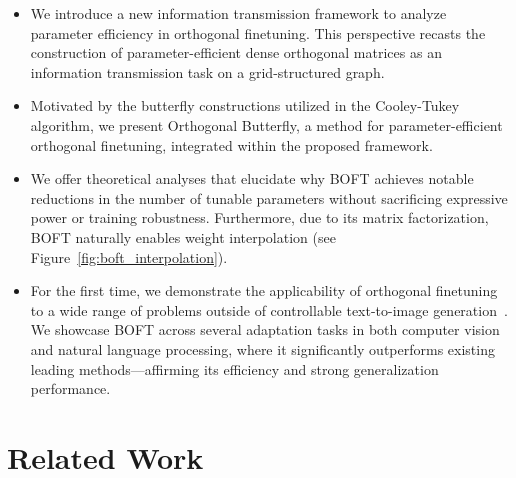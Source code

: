 \begin{itemize}[leftmargin=*,nosep]
    \item We introduce a new information transmission framework to analyze parameter efficiency in orthogonal finetuning. This perspective recasts the construction of parameter-efficient dense orthogonal matrices as an information transmission task on a grid-structured graph.
    \item Motivated by the butterfly constructions utilized in the Cooley-Tukey algorithm, we present Orthogonal Butterfly, a method for parameter-efficient orthogonal finetuning, integrated within the proposed framework.
    \item We offer theoretical analyses that elucidate why BOFT achieves notable reductions in the number of tunable parameters without sacrificing expressive power or training robustness. Furthermore, due to its matrix factorization, BOFT naturally enables weight interpolation (see Figure~\ref{fig:boft_interpolation}).
    \item For the first time, we demonstrate the applicability of orthogonal finetuning to a wide range of problems outside of controllable text-to-image generation~\cite{qiu2023controlling}. We showcase BOFT across several adaptation tasks in both computer vision and natural language processing, where it significantly outperforms existing leading methods—affirming its efficiency and strong generalization performance.
\end{itemize}

\section{Related Work}


